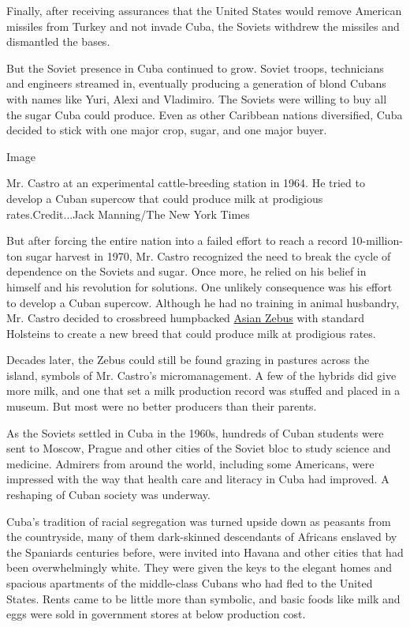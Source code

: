 Finally, after receiving assurances that the United States would remove
American missiles from Turkey and not invade Cuba, the Soviets withdrew
the missiles and dismantled the bases.

But the Soviet presence in Cuba continued to grow. Soviet troops,
technicians and engineers streamed in, eventually producing a generation
of blond Cubans with names like Yuri, Alexi and Vladimiro. The Soviets
were willing to buy all the sugar Cuba could produce. Even as other
Caribbean nations diversified, Cuba decided to stick with one major
crop, sugar, and one major buyer.

Image

Mr. Castro at an experimental cattle-breeding station in 1964. He tried
to develop a Cuban supercow that could produce milk at prodigious
rates.Credit...Jack Manning/The New York Times

But after forcing the entire nation into a failed effort to reach a
record 10-million-ton sugar harvest in 1970, Mr. Castro recognized the
need to break the cycle of dependence on the Soviets and sugar. Once
more, he relied on his belief in himself and his revolution for
solutions. One unlikely consequence was his effort to develop a Cuban
supercow. Although he had no training in animal husbandry, Mr. Castro
decided to crossbreed humpbacked
\href{http://www.britannica.com/EBchecked/topic/77082/Brahman}{Asian
Zebus} with standard Holsteins to create a new breed that could produce
milk at prodigious rates.

Decades later, the Zebus could still be found grazing in pastures across
the island, symbols of Mr. Castro's micromanagement. A few of the
hybrids did give more milk, and one that set a milk production record
was stuffed and placed in a museum. But most were no better producers
than their parents.

As the Soviets settled in Cuba in the 1960s, hundreds of Cuban students
were sent to Moscow, Prague and other cities of the Soviet bloc to study
science and medicine. Admirers from around the world, including some
Americans, were impressed with the way that health care and literacy in
Cuba had improved. A reshaping of Cuban society was underway.

Cuba's tradition of racial segregation was turned upside down as
peasants from the countryside, many of them dark-skinned descendants of
Africans enslaved by the Spaniards centuries before, were invited into
Havana and other cities that had been overwhelmingly white. They were
given the keys to the elegant homes and spacious apartments of the
middle-class Cubans who had fled to the United States. Rents came to be
little more than symbolic, and basic foods like milk and eggs were sold
in government stores at below production cost.

